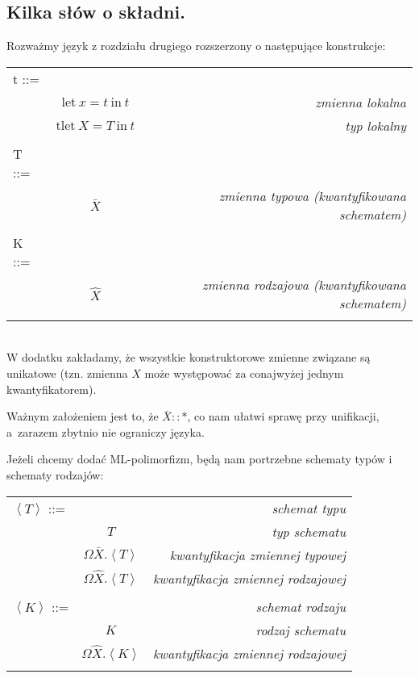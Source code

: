 \documentclass[11pt,leqno]{article}
\begin{document}
\subsection{Kilka słów o składni.}

Rozważmy język z rozdziału drugiego rozszerzony o następujące konstrukcje: \\

\begin{tabular}{| l c r |}
  \hline
  t ::= &  &  \\
   & $\textrm{let} \ x = t \ \textrm{in} \ t$ & \textit{zmienna lokalna} \\
   & $\textrm{tlet} \ X = T \ \textrm{in} \ t$ & \textit{typ lokalny} \\
   & & \\
  T ::= &  &  \\
   & $\bar{X}$ & \textit{zmienna typowa (kwantyfikowana schematem)} \\
   & & \\
  K ::= & & \\
   & $\widehat{X}$ & \textit{zmienna rodzajowa (kwantyfikowana schematem)} \\
   & & \\
  \hline
\end{tabular} \\

W dodatku zakładamy, że wszystkie konstruktorowe zmienne związane są unikatowe (tzn. zmienna $X$ może
występować za conajwyżej jednym kwantyfikatorem).

Ważnym założeniem jest to, że $\bar{X}::*$, co nam ułatwi sprawę przy unifikacji, a~zarazem zbytnio nie ograniczy języka.
  
Jeżeli chcemy dodać ML-polimorfizm, będą nam portrzebne schematy typów i schematy rodzajów:\\

\begin{tabular}{| l c r |}
  \hline
  $\left<T\right>$ ::= &  & \textit{schemat typu} \\
   & $T$ & \textit{typ schematu} \\
   & $\Omega \bar{X}.\left<T\right>$ & \textit{kwantyfikacja zmiennej typowej} \\
   & $\Omega \widehat{X}.\left<T\right>$ & \textit{kwantyfikacja zmiennej rodzajowej} \\
   & & \\
  $\left<K\right>$ ::= &  & \textit{schemat rodzaju} \\
   & $K$ & \textit{rodzaj schematu}\\
   & $\Omega \widehat{X}.\left<K\right>$ & \textit{kwantyfikacja zmiennej rodzajowej} \\
   & & \\
  \hline
\end{tabular} \\
\end{document}
